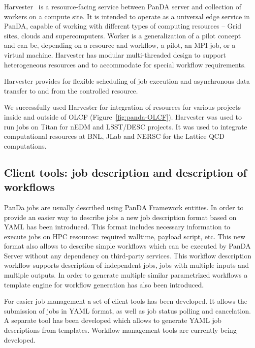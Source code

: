 \documentclass{webofc}
\begin{document}
Harvester~\cite{Megino_2017} is a resource-facing service between PanDA server and collection of workers on a compute site. It is intended to operate as a universal edge service in PanDA, capable of working with different types of computing resources -- Grid sites, clouds and supercomputers. Worker is a generalization of a pilot concept and can be, depending on a resource and workflow, a pilot, an MPI job, or a virtual machine. Harvester has modular multi-threaded design to support heterogeneous resources and to accommodate for special workflow requirements.

Harvester provides for flexible scheduling of job execution and asynchronous data transfer to and from the controlled resource.

We successfully used Harvester for integration of resources for various projects inside and outside of OLCF (Figure~\ref{fig:panda-OLCF}). Harvester was used to run jobs on Titan for nEDM and LSST/DESC projects. It was used to integrate computational resources at BNL, JLab and NERSC for the Lattice QCD computations.

\subsection{Client tools: job description and description of workflows}

PanDa jobs are usually described using PanDA Framework entities. In order to provide an easier way to describe jobs a new job description format based on YAML has been introduced. This format includes necessary information to execute jobs on HPC resources: required walltime, payload script, etc. This new format also allows to describe simple workflows which can be executed by PanDA Server without any dependency on third-party services. This workflow description workflow supports description of independent jobs, jobs with multiple inputs and multiple outputs. In order to generate multiple similar parametrized workflows a template engine for workflow generation has also been introduced.

For easier job management a set of client tools has been developed. It allows the submission of jobs in YAML format, as well as job status polling and cancelation. A separate tool has been developed which allows to generate YAML job descriptions from templates. Workflow management tools are currently being developed.


\end{document}

